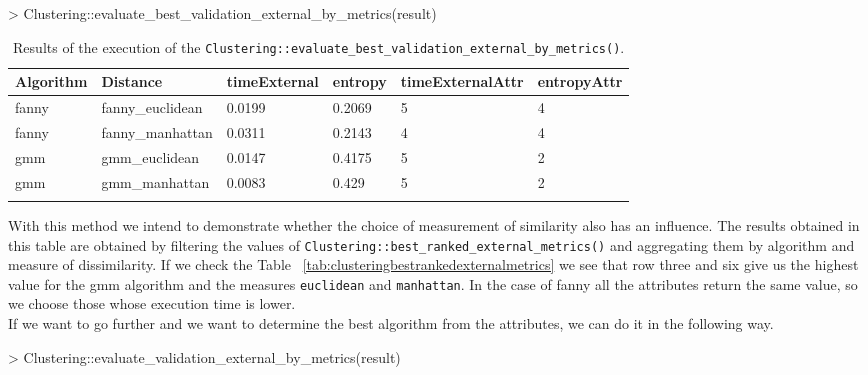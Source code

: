 \begin{Schunk}
\begin{Sinput}
> Clustering::evaluate_best_validation_external_by_metrics(result)
\end{Sinput}
\end{Schunk}
{\small
\begin{longtable}{| p{1cm} | p{1.8cm} |  p{1.6cm} | p{0.8cm} | p{1.9cm} | p{1.8cm} |}
\hline
\scriptsize  Algorithm & \scriptsize    Distance     & \scriptsize timeExternal & \scriptsize entropy & \scriptsize timeExternalAttr & \scriptsize entropyAttr \\
\hline
\scriptsize   fanny    & \scriptsize fanny\_euclidean & \scriptsize    0.0199    & \scriptsize  0.2069 & \scriptsize        5         & \scriptsize     4 \\
\cline{2-6}
\scriptsize   fanny    & \scriptsize fanny\_manhattan & \scriptsize    0.0311    & \scriptsize  0.2143 & \scriptsize        4         & \scriptsize     4 \\
\hline
\scriptsize    gmm     & \scriptsize  gmm\_euclidean  & \scriptsize    0.0147    & \scriptsize  0.4175 & \scriptsize        5         & \scriptsize     2 \\
\cline{2-6}
\scriptsize    gmm     & \scriptsize  gmm\_manhattan  & \scriptsize    0.0083    & \scriptsize   0.429 & \scriptsize        5         & \scriptsize     2 \\
\hline
\caption{Results of the execution of the \texttt{Clustering::evaluate\_best\_validation\_external\_by\_metrics()}.}
\label{tab:evaluatebestvalidationexternalbymetrics}
\end{longtable}}

With this method we intend to demonstrate whether the choice of measurement of similarity also has an influence.
The results obtained in this table are obtained by filtering the values of \texttt{Clustering::best\_ranked\_external\_metrics()} and aggregating them by algorithm and measure of dissimilarity. If we check the Table ~\ref{tab:clusteringbestrankedexternalmetrics} we see that row three and six give us the highest value for the gmm algorithm and the measures \texttt{euclidean} and \texttt{manhattan}. In the case of fanny all the attributes return the same value, so we choose those whose execution time is lower.
\\
If we want to go further and we want to determine the best algorithm from the attributes, we can do it in the following way.

\begin{Schunk}
\begin{Sinput}
> Clustering::evaluate_validation_external_by_metrics(result)
\end{Sinput}
\end{Schunk}

